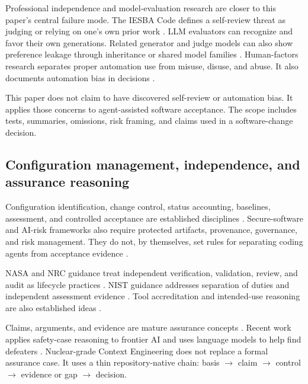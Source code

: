\documentclass[11pt]{article}
\newcommand{\method}{Nuclear-grade Context Engineering}
\begin{document}
Professional independence and model-evaluation research are closer to this paper's central failure mode. The IESBA Code defines a self-review threat as judging or relying on one's own prior work \citep{iesba2026code}. LLM evaluators can recognize and favor their own generations. Related generator and judge models can also show preference leakage through inheritance or shared model families \citep{panickssery2024evaluators,li2025preference}. Human-factors research separates proper automation use from misuse, disuse, and abuse. It also documents automation bias in decisions \citep{parasuraman1997automation,skitka1999automation}.

This paper does not claim to have discovered self-review or automation bias. It applies those concerns to agent-assisted software acceptance. The scope includes tests, summaries, omissions, risk framing, and claims used in a software-change decision.

\subsection{Configuration management, independence, and assurance reasoning}

Configuration identification, change control, status accounting, baselines, assessment, and controlled acceptance are established disciplines \citep{doe2016cm,nrc2013rg169}. Secure-software and AI-risk frameworks also require protected artifacts, provenance, governance, and risk management. They do not, by themselves, set rules for separating coding agents from acceptance evidence \citep{nist2022ssdf,nist2023airmf}.

NASA and NRC guidance treat independent verification, validation, review, and audit as lifecycle practices \citep{nasa2022swe141,nasa2022assurance,nrc2013rg168}. NIST guidance addresses separation of duties and independent assessment evidence \citep{nist2022assessment}. Tool accreditation and intended-use reasoning are also established ideas \citep{nasa2022swe136}.

Claims, arguments, and evidence are mature assurance concepts \citep{nist2022systems,omg2023sacm}. Recent work applies safety-case reasoning to frontier AI and uses language models to help find defeaters \citep{buhl2024safetycases,gohar2024codefeater}. \method{} does not replace a formal assurance case. It uses a thin repository-native chain: basis $\rightarrow$ claim $\rightarrow$ control $\rightarrow$ evidence or gap $\rightarrow$ decision.
\end{document}
